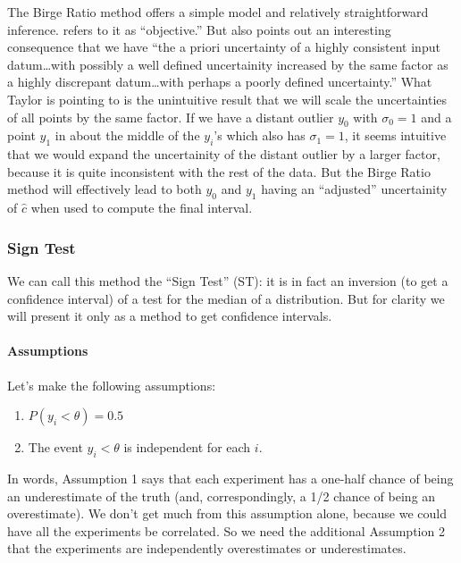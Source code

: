 \documentclass[letterpaper,12pt]{article}
\begin{document}
The Birge Ratio method offers a simple model and relatively straightforward inference. \citet{taylor1982numerical} refers to it as ``objective.'' But \citet{taylor1982numerical} also points out an interesting consequence that we have ``the a priori uncertainty of a highly consistent input datum\ldots with possibly a well defined uncertainity increased by the same factor as a highly discrepant datum\ldots with perhaps a poorly defined uncertainty.'' What Taylor is pointing to is the unintuitive result that we will scale the uncertainties of all points by the same factor. If we have a distant outlier $y_0$ with $\sigma_0=1$ and a point $y_1$ in about the middle of the $y_i$'s which also has $\sigma_1=1$, it seems intuitive that we would expand the uncertainity of the distant outlier by a larger factor, because it is quite inconsistent with the rest of the data. But the Birge Ratio method will effectively lead to both $y_0$ and $y_1$ having an ``adjusted'' uncertainity of $\hat c$ when used to compute the final interval.

\subsubsection{Sign Test}\label{sec:st}

We can call this method the ``Sign Test'' (ST): it is in fact an inversion (to get a confidence interval) of a test for the median of a distribution. But for clarity we will present it only as a method to get confidence intervals.

\paragraph{Assumptions}\label{assumptions-3}

Let's make the following assumptions:

\begin{enumerate}
\item $P(y_i<\theta)=0.5$
\item The event $y_i<\theta$ is independent for each $i$.
\end{enumerate}

In words, Assumption 1 says that each experiment has a one-half chance of being an underestimate of the truth (and, correspondingly, a 1/2 chance of being an overestimate). We don't get much from this assumption alone, because we could have all the experiments be correlated. So we need the additional Assumption 2 that the experiments are independently overestimates or underestimates.
\end{document}

